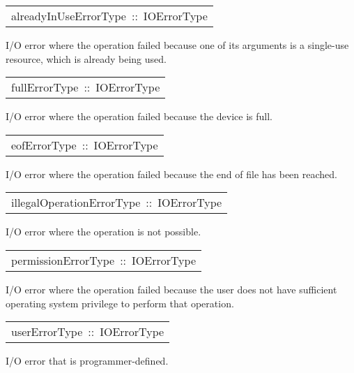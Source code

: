 \begin{haddockdesc}
\item[\begin{tabular}{@{}l}
alreadyInUseErrorType\ ::\ IOErrorType
\end{tabular}]\haddockbegindoc
I/O error where the operation failed because one of its arguments
 is a single-use resource, which is already being used.
\par

\end{haddockdesc}
\begin{haddockdesc}
\item[\begin{tabular}{@{}l}
fullErrorType\ ::\ IOErrorType
\end{tabular}]\haddockbegindoc
I/O error where the operation failed because the device is full.
\par

\end{haddockdesc}
\begin{haddockdesc}
\item[\begin{tabular}{@{}l}
eofErrorType\ ::\ IOErrorType
\end{tabular}]\haddockbegindoc
I/O error where the operation failed because the end of file has
 been reached.
\par

\end{haddockdesc}
\begin{haddockdesc}
\item[\begin{tabular}{@{}l}
illegalOperationErrorType\ ::\ IOErrorType
\end{tabular}]\haddockbegindoc
I/O error where the operation is not possible.
\par

\end{haddockdesc}
\begin{haddockdesc}
\item[\begin{tabular}{@{}l}
permissionErrorType\ ::\ IOErrorType
\end{tabular}]\haddockbegindoc
I/O error where the operation failed because the user does not
 have sufficient operating system privilege to perform that operation.
\par

\end{haddockdesc}
\begin{haddockdesc}
\item[\begin{tabular}{@{}l}
userErrorType\ ::\ IOErrorType
\end{tabular}]\haddockbegindoc
I/O error that is programmer-defined.
\par

\end{haddockdesc}